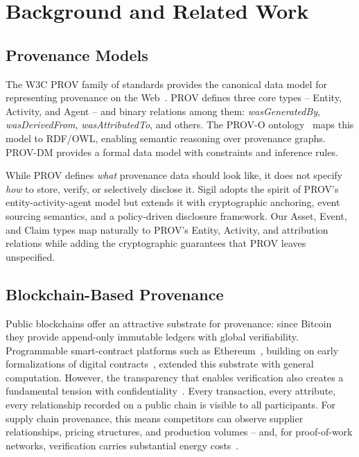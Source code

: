 \documentclass[conference]{IEEEtran}
\begin{document}

\section{Background and Related Work}

\subsection{Provenance Models}

The W3C PROV family of standards provides the canonical data model for
representing provenance on the Web~\cite{w3c-prov2013}. PROV defines three core
types -- Entity, Activity, and Agent -- and binary relations among them:
\emph{wasGeneratedBy}, \emph{wasDerivedFrom}, \emph{wasAttributedTo}, and
others. The PROV-O ontology~\cite{groth2013} maps this model to RDF/OWL,
enabling semantic reasoning over provenance graphs. PROV-DM provides a formal
data model with constraints and inference rules.

While PROV defines \emph{what} provenance data should look like, it does not
specify \emph{how} to store, verify, or selectively disclose it. Sigil adopts
the spirit of PROV's entity-activity-agent model but extends it with
cryptographic anchoring, event sourcing semantics, and a policy-driven
disclosure framework. Our Asset, Event, and Claim types map naturally to
PROV's Entity, Activity, and attribution relations while adding the
cryptographic guarantees that PROV leaves unspecified.

\subsection{Blockchain-Based Provenance}

Public blockchains offer an attractive substrate for provenance: since
Bitcoin~\cite{nakamoto2008} they provide append-only immutable ledgers with
global verifiability.  Programmable smart-contract platforms such as
Ethereum~\cite{buterin2014,wood2014}, building on early formalizations of
digital contracts~\cite{szabo1997}, extended this substrate with general
computation.  However, the transparency that enables verification also creates
a fundamental tension with confidentiality~\cite{xu2017,eberhardt2017}.  Every
transaction, every attribute, every relationship recorded on a public chain is
visible to all participants.  For supply chain provenance, this means
competitors can observe supplier relationships, pricing structures, and
production volumes -- and, for proof-of-work networks, verification carries
substantial energy costs~\cite{sedlmeir2021}.
\end{document}
